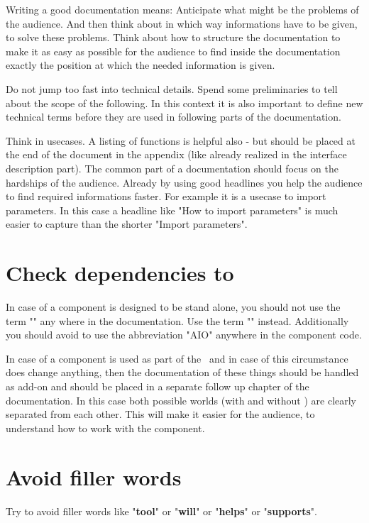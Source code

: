 \documentclass[a4paper,10pt]{report}
\begin{document}
Writing a good documentation means: Anticipate what might be the problems of the audience. And then think about in which way informations have to be given,
to solve these problems. Think about how to structure the documentation to make it as easy as possible for the audience to find inside the documentation exactly the position
at which the needed information is given.

Do not jump too fast into technical details. Spend some preliminaries to tell about the scope of the following. In this context it is also important to define new technical terms
before they are used in following parts of the documentation.

Think in usecases. A listing of functions is helpful also - but should be placed at the end of the document in the appendix (like already realized in the interface
description part).
The common part of a documentation should focus on the hardships of the audience. Already by using good headlines you help the audience to find required informations faster.
For example it is a usecase to import parameters. In this case a headline like "How to import parameters" is much easier to capture than the shorter "Import parameters".

\section{Check dependencies to \rfw}

In case of a component is designed to be stand alone, you should not use the term "\rfw" any where in the documentation.
Use the term "\rfwcore" instead. Additionally you should avoid to use the abbreviation "AIO" anywhere in the component code.

In case of a component is used as part of the \rfw\ and in case of this circumstance does change anything, then the documentation
of these things should be handled as add-on and should be placed in a separate follow up chapter of the documentation.
In this case both possible worlds (with and without \rfw) are clearly separated from each other. This will make it easier for the audience, to understand
how to work with the component.

\newpage

\section{Avoid filler words}

Try to avoid filler words like "\textbf{tool}" or "\textbf{will}" or "\textbf{helps}" or "\textbf{supports}".
\end{document}
